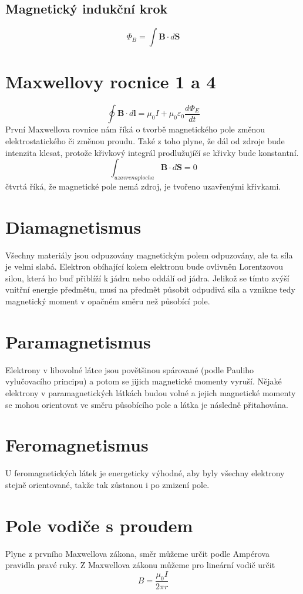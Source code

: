 \documentclass[titlepage]{report}
\begin{document}
\subsection{Magnetický indukční krok}
\begin{equation}
\Phi_B = \int \boldsymbol B \cdot d \boldsymbol S
\end{equation}
\section{Maxwellovy rocnice 1 a 4}
\begin{equation}
\oint \boldsymbol B \cdot d \boldsymbol l = \mu_0 I + \mu_0\varepsilon_0 \frac{d\Phi_E}{dt}
\end{equation}
První Maxwellova rovnice nám říká o tvorbě magnetického pole změnou elektrostatického či změnou proudu. Také z toho plyne, že dál od zdroje bude intenzita klesat, protože křivkový integrál prodlužujíčí se křivky bude konstantní.
\begin{equation}
\int_{uzavrena plocha} \boldsymbol B \cdot d \boldsymbol S = 0
\end{equation}
čtvrtá říká, že magnetické pole nemá zdroj, je tvořeno uzavřenými křivkami.
\section{Diamagnetismus}
Všechny materiály jsou odpuzovány magnetickým polem odpuzovány, ale ta síla je velmi slabá. Elektron obíhající kolem elektronu bude ovlivněn Lorentzovou silou, která ho buď přiblíží k jádru nebo oddálí od jádra. Jelikož se tímto zvýší vnitřní energie předmětu, musí na předmět působit odpudivá síla a vznikne tedy magnetický moment v opačném směru než působící pole.
\section{Paramagnetismus}
Elektrony v libovolné látce jsou povětšinou spárované (podle Pauliho vylučovacího principu) a potom se jijich magnetické momenty vyruší. Nějaké elektrony v paramagnetických látkách budou volné a jejich magnetické momenty se mohou orientovat ve směru působícího pole a látka je následně přitahována.
\section{Feromagnetismus}
U feromagnetických látek je energeticky výhodné, aby byly všechny elektrony stejně orientované, takže tak zůstanou i po zmizení pole.
\section{Pole vodiče s proudem}
Plyne z prvního Maxwellova zákona, směr můžeme určit podle Ampérova pravidla pravé ruky. Z Maxwellova zákonu můžeme pro lineární vodič určit\\
\begin{equation}
B = \frac{\mu_0 I}{2 \pi r}
\end{equation}
\end{document}
